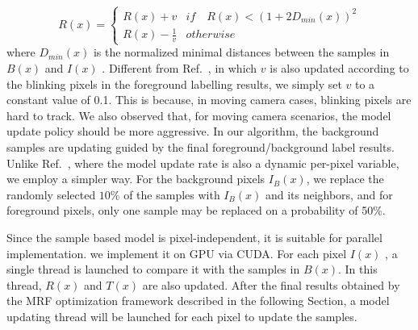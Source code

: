 $$ R(x) = \begin{cases}  R(x)+v & if \quad {R(x)<(1+2D_{min}(x))}^{2} \\  R(x) - \frac{1 }{v } & otherwise \end{cases}$$
where $D_{min}(x)$ is the normalized minimal distances between the samples in $B(x)$ and $I(x)$ . Different from Ref.~, in which $v$ is also updated according to the blinking pixels in the foreground labelling results, we simply set $v$ to a constant value of 0.1. This is because, in moving camera cases, blinking pixels are hard to track. We also observed that, for moving camera scenarios, the model update policy should be more aggressive. In our algorithm, the background samples are updating guided by the final foreground/background label results. Unlike Ref.~, where the model update rate is also a dynamic per-pixel  variable, we employ a simpler way. For the background pixels $I_{B}(x)$, we replace the randomly selected $10\%$ of the samples with $I_{B}(x)$ and its neighbors, and for foreground pixels, only one sample may be replaced on a probability of 50\%. \par
Since the sample based model is pixel-independent, it is suitable for parallel implementation. we implement it on GPU via CUDA. For each pixel $I(x)$ , a single thread is launched to compare it with the samples in $B(x)$. In this thread, $R(x)$ and $T(x)$ are also updated. After the final results obtained by the MRF optimization framework described in the following Section, a model updating thread will be launched for each pixel to update the samples.

